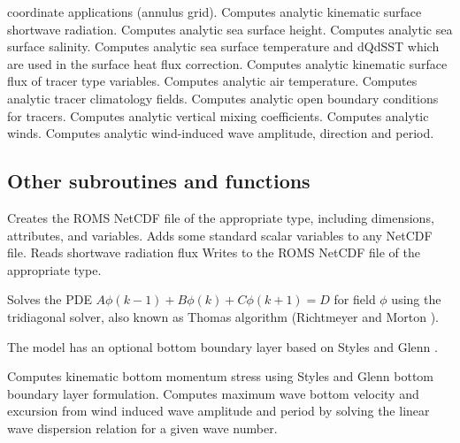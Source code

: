 \begin{klist}
   coordinate applications (annulus grid).
       Computes analytic kinematic surface
   shortwave radiation.
       Computes analytic sea surface height.
       Computes analytic sea surface salinity.
       Computes analytic sea surface temperature
   and dQdSST which are used in the surface heat flux correction.
       Computes analytic kinematic surface
   flux of tracer type variables.
       Computes analytic air temperature.
       Computes analytic tracer climatology fields.
       Computes analytic open boundary conditions for
   tracers.
       Computes analytic vertical mixing coefficients.
       Computes analytic winds.
       Computes analytic wind-induced wave amplitude,
     direction and period.
   \end{klist}

\subsection{Other subroutines and functions}
\label{Minor}
\begin{klist}
 \mbox{\hspace{1in}}
   \begin{klist}
      Creates the ROMS NetCDF file of the appropriate
   type, including dimensions, attributes, and variables.
      Adds some standard scalar variables to any NetCDF file.
       Reads shortwave radiation flux
      Writes to the ROMS NetCDF file of the appropriate type.
   \end{klist}
   \begin{klist}
       Solves the PDE
   $A \phi(k-1) + B \phi(k) + C \phi(k+1) = D$
     for field $\phi$ using the tridiagonal solver, also known as
  Thomas algorithm (Richtmeyer and Morton \cite{Richtmeyer}).
   \end{klist}
 The model has an optional bottom
boundary layer based on Styles and Glenn \cite{Styles96}.
   \begin{klist}
       Computes kinematic bottom momentum stress using
   Styles and Glenn \cite{Styles96} bottom boundary layer formulation.
        Computes maximum wave bottom velocity and
   excursion from wind induced wave amplitude and period by
   solving the linear wave dispersion relation for a given
   wave number.
   \end{klist}
\end{klist}


